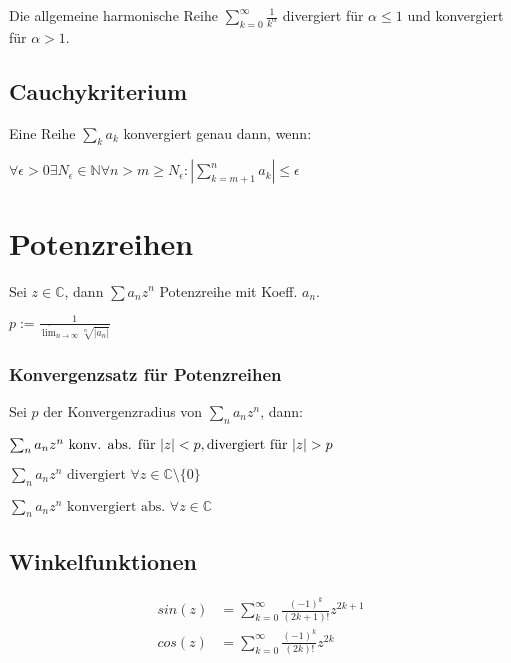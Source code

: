Die allgemeine harmonische Reihe $\sum_{k=0}^\infty \frac{1}{k^\alpha}$ divergiert für $\alpha \leq 1$ und konvergiert für $\alpha > 1$.

\subsection*{Cauchykriterium}

Eine Reihe $\sum_k a_k$ konvergiert genau dann, wenn:

$\forall \epsilon > 0 \exists N_\epsilon \in \mathbb{N} \forall n > m \geq N_\epsilon : | \sum_{k=m+1}^{n} a_k | \leq \epsilon$

\section*{Potenzreihen}

Sei $z \in \mathbb{C}$, dann $\sum a_n z^n$ Potenzreihe mit Koeff. $a_n$.

\begin{description}[leftmargin=!]
	\item[Konvergenzradius] $p := \frac{1}{\overline\lim_{n \to \infty} \sqrt[n]{|a_n|}}$
\end{description}

\subsubsection*{Konvergenzsatz für Potenzreihen}

Sei $p$ der Konvergenzradius von $\sum_n a_n z^n$, dann:

\begin{description}[leftmargin=!,labelwidth=15mm]
	\item[$p \in (0, \infty)$] $\sum_n a_n z^n \text{ konv. abs. für } |z| < p, \\ \text{divergiert für } |z| > p$
	\item[$p=0$] $\sum_n a_n z^n \text{ divergiert } \forall z \in \mathbb{C}\setminus \{0\}$
	\item[$p=\infty$] $\sum_n a_n z^n \text{ konvergiert abs. } \forall z \in \mathbb{C}$
\end{description}

\subsection*{Winkelfunktionen}

\vspace*{-3mm}
\begin{align*}
	sin(z) &= \textstyle\sum_{k=0}^\infty \frac{(-1)^k}{(2k+1)!} z^{2k+1} \\
	cos(z) &= \textstyle\sum_{k=0}^\infty \frac{(-1)^k}{(2k)!} z^{2k}
\end{align*}

